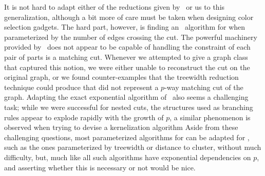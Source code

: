 
It is not hard to adapt either of the reductions given by~\cite{chvatal_matching_cut} or us to this generalization, although a bit more of care must be taken when designing color selection gadgets.
The hard part, however, is finding an \FPT\ algorithm for  when parameterized by the number of edges crossing the cut.
The powerful machinery provided by~\cite{marx_treewidth_reduction} does not appear to be capable of handling the constraint of each pair of parts is a matching cut.
Whenever we attempted to give a graph class that captured this notion, we were either unable to reconstruct the cut on the original graph, or we found counter-examples that the treewidth reduction technique could produce that did not represent a $p$-way matching cut of the graph.
Adapting the exact exponential algorithm of~\cite{matching_cut_ipec} also seems a challenging task; while we were successful for nested cuts, the structures used as branching rules appear to explode rapidly with the growth of $p$, a similar phenomenon is observed when trying to devise a kernelization algorithm
Aside from these challenging questions, most parameterized algorithms for  can be adapted for , such as the ones parameterized by treewidth or distance to cluster, without much difficulty, but, much like  all such algorithms have exponential dependencies on $p$, and asserting whether this is necessary or not would be nice. 





